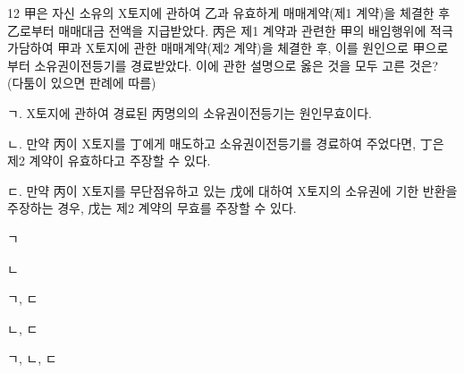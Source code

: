 \begin{question}{12}
甲은 자신 소유의 X토지에 관하여 乙과 유효하게 매매계약(제1 계약)을 체결한 후 乙로부터 매매대금 전액을 지급받았다. 丙은 제1 계약과 관련한 甲의 배임행위에 적극 가담하여 甲과 X토지에 관한 매매계약(제2 계약)을 체결한 후, 이를 원인으로 甲으로부터 소유권이전등기를 경료받았다. 이에 관한 설명으로 옳은 것을 모두 고른 것은? (다툼이 있으면 판례에 따름)
\begin{framedtext}
ㄱ. X토지에 관하여 경료된 丙명의의 소유권이전등기는 원인무효이다. \par
ㄴ. 만약 丙이 X토지를 丁에게 매도하고 소유권이전등기를 경료하여 주었다면, 丁은 제2 계약이 유효하다고 주장할 수 있다. \par
ㄷ. 만약 丙이 X토지를 무단점유하고 있는 戊에 대하여 X토지의 소유권에 기한 반환을 주장하는 경우, 戊는 제2 계약의 무효를 주장할 수 있다.
\end{framedtext}
\begin{choices}
  \item ㄱ
  \item ㄴ
  \item ㄱ, ㄷ
  \item ㄴ, ㄷ
  \item ㄱ, ㄴ, ㄷ
\end{choices}
\end{question}
